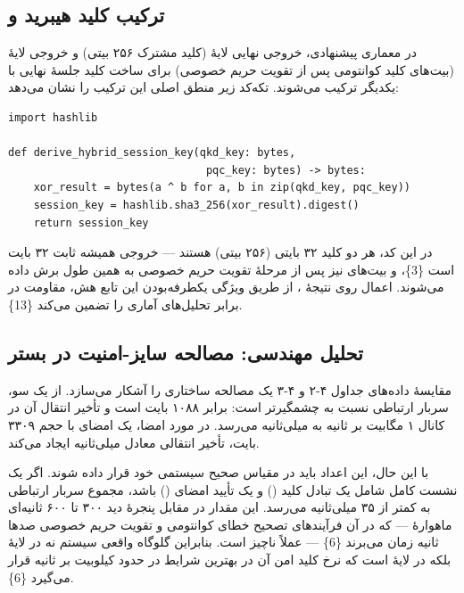 \documentclass[a4paper,14pt]{extreport}
\begin{document}
\subsection{ترکیب کلید هیبرید  و }

در معماری پیشنهادی، خروجی نهایی لایهٔ  (کلید مشترک ۲۵۶ بیتی) و خروجی لایهٔ  (بیت‌های کلید کوانتومی پس از تقویت حریم خصوصی) برای ساخت کلید جلسهٔ نهایی با یکدیگر ترکیب می‌شوند. تکه‌کد زیر منطق اصلی این ترکیب را نشان می‌دهد:

\begin{small}
\begin{latin}
\begin{verbatim}
import hashlib

def derive_hybrid_session_key(qkd_key: bytes,
                               pqc_key: bytes) -> bytes:
    xor_result = bytes(a ^ b for a, b in zip(qkd_key, pqc_key))
    session_key = hashlib.sha3_256(xor_result).digest()
    return session_key
\end{verbatim}
\end{latin}
\end{small}

در این کد، هر دو کلید ۳۲ بایتی (۲۵۶ بیتی) هستند --- خروجی  همیشه ثابت ۳۲ بایت است \{3\}، و بیت‌های  نیز پس از مرحلهٔ تقویت حریم خصوصی  به همین طول برش داده می‌شوند. اعمال  روی نتیجهٔ ، از طریق ویژگی یکطرفه‌بودن این تابع هش، مقاومت در برابر تحلیل‌های آماری را تضمین می‌کند \{13\}.

\subsection{تحلیل مهندسی: مصالحه سایز-امنیت در بستر }

مقایسهٔ داده‌های جداول ۴-۲ و ۴-۳ یک مصالحه  ساختاری را آشکار می‌سازد. از یک سو، سربار ارتباطی  نسبت به  چشمگیرتر است:   برابر ۱۰۸۸ بایت است و تأخیر انتقال آن در کانال ۱ مگابیت بر ثانیه به  میلی‌ثانیه می‌رسد. در مورد امضا، یک امضای  با حجم ۳۳۰۹ بایت، تأخیر انتقالی معادل  میلی‌ثانیه ایجاد می‌کند.

با این حال، این اعداد باید در مقیاس صحیح سیستمی خود قرار داده شوند. اگر یک نشست کامل شامل یک تبادل کلید  () و یک تأیید امضای  () باشد، مجموع سربار ارتباطی به کمتر از ۳۵ میلی‌ثانیه می‌رسد. این مقدار در مقابل پنجرهٔ دید ۳۰۰ تا ۶۰۰ ثانیه‌ای ماهوارهٔ  --- که در آن فرآیندهای تصحیح خطای کوانتومی و تقویت حریم خصوصی صدها ثانیه زمان می‌برند \{6\} --- عملاً ناچیز است. بنابراین گلوگاه واقعی سیستم نه در لایهٔ  بلکه در لایهٔ  است که نرخ کلید امن آن در بهترین شرایط  در حدود  کیلوبیت بر ثانیه قرار می‌گیرد \{6\}.
\end{document}
